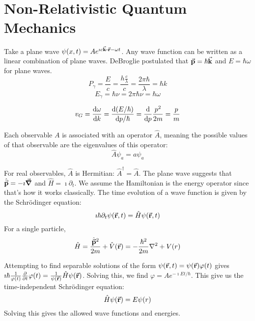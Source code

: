 \documentclass[a4paper,twoside,master.tex]{subfiles}
\begin{document}

\section{Non-Relativistic Quantum Mechanics}
\label{sec:non-relativistic_quantum_mechanics}

Take a plane wave $ \psi(x, t) = A e^{\imath c \va{k} \vdot \va{r} - \omega t} $. Any wave function can be written as a linear combination of plane waves. DeBroglie postulated that $ \va{p} = \hbar \va{k} $ and $ E = \hbar \omega $ for plane waves.
\begin{equation}
    P_{\gamma} = \frac{E}{c} = \frac{h \frac{c}{\lambda}}{c} = \frac{2 \pi \hbar}{\lambda} = \hbar k
\end{equation}
\begin{equation}
    E_{\gamma} = \hbar \nu = 2 \pi \hbar \nu = \hbar \omega
\end{equation}

\begin{equation}
    v_G = \dv{\omega}{k} = \dv{(E/ \hbar)}{p/ \hbar} = \dv{p} \frac{p^2}{2m} = \frac{p}{m}
\end{equation}

Each observable $ A $ is associated with an operator $ \hat{A} $, meaning the possible values of that observable are the eigenvalues of this operator:
\begin{equation}
    \hat{A} \psi_a = a \psi_a
\end{equation}

For real observables, $ \hat{A} $ is Hermitian: $ \hat{A}^\dagger = \hat{A} $. The plane wave suggests that $ \hat{\va{p}} = - \imath \grad $ and $ \hat{H} = \imath \partial_t $. We assume the Hamiltonian is the energy operator since that's how it works classically. The time evolution of a wave function is given by the Schr\"odinger equation:
\begin{equation}
    \imath \hbar \partial_t \psi(\va{r}, t) = \hat{H} \psi(\va{r}, t)
\end{equation}
For a single particle,
\begin{equation}
    \hat{H} = \frac{\hat{\va{p}}^2}{2m} + \hat{V}(\va{r}) = - \frac{\hbar^2}{2m} \laplacian + V(r)
\end{equation}

Attempting to find separable solutions of the form $ \psi(\va{r}, t) = \psi(\va{r}) \varphi(t) $ gives $ \imath \hbar \frac{1}{\varphi(t)} \pdv{t} \varphi(t) = \frac{1}{\psi(\va{r})} \hat{H} \psi(\va{r}) $. Solving this, we find $ \varphi = A e^{- \imath E t / \hbar} $. This give us the time-independent Schr\"odinger equation:
\begin{equation}
    \hat{H} \psi(\va{r}) = E \psi(r)
\end{equation}
Solving this gives the allowed wave functions and energies.
\end{document}
